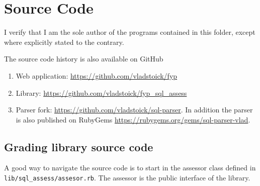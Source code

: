 \chapter{Source Code}

I verify that I am the sole author of the programs contained in this folder, except where explicitly stated to the contrary.

The source code history is also available on GitHub
\begin{enumerate}
    \item Web application: \url{https://github.com/vladstoick/fyp}
    \item Library: \url{https://github.com/vladstoick/fyp_sql_assess}
    \item Parser fork: \url{https://github.com/vladstoick/sql-parser}. In addition the parser is also published on RubyGems \url{https://rubygems.org/gems/sql-parser-vlad}.
\end{enumerate}

\section{Grading library source code}

A good way to navigate the source code is to start in the assessor class defined in \texttt{lib/sql\_assess/assesor.rb}. The assessor is the public interface of the library.

